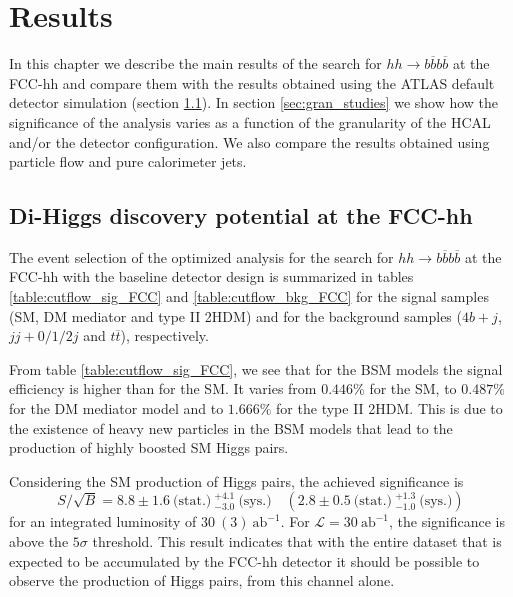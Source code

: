 
\chapter{Results}
\label{chapter:results}

In this chapter we describe the main results of the search for $hh\rightarrow b\overline{b}b\overline{b}$ at the FCC-hh and compare them with the results obtained using the ATLAS default detector simulation (section \ref{sec:dihiggs_FCC}). In section \ref{sec:gran_studies} we show how the significance of the analysis varies as a function of the granularity of the HCAL and/or the detector configuration. We also compare the results obtained using particle flow and pure calorimeter jets.

\section{Di-Higgs discovery potential at the FCC-hh}
\label{sec:dihiggs_FCC}

The event selection of the optimized analysis for the search for $hh\rightarrow b\overline{b}b\overline{b}$ at the FCC-hh with the baseline detector design is summarized in tables \ref{table:cutflow_sig_FCC} and \ref{table:cutflow_bkg_FCC} for the signal samples (SM, DM mediator and type II 2HDM) and for the background samples ($4b+j$, $jj+0/1/2 j$ and $t\overline{t}$), respectively.

From table \ref{table:cutflow_sig_FCC}, we see that for the BSM models the signal efficiency is higher than for the SM. It varies from $0.446\%$ for the SM, to $0.487\%$ for the DM mediator model and to $1.666\%$ for the type II 2HDM. This is due to the existence of heavy new particles in the BSM models that lead to the production of highly boosted SM Higgs pairs.

Considering the SM production of Higgs pairs, the achieved significance is
\begin{equation}
	S/\sqrt{B}=8.8\pm 1.6~\text{(stat.)}~^{+4.1}_{-3.0}~\text{(sys.)}\quad \left(2.8\pm 0.5~\text{(stat.)}~^{+1.3}_{-1.0}~\text{(sys.)}\right)
\end{equation}
for an integrated luminosity of $30~(3)~\text{ab}^{-1}$. For $\mathcal{L}=30~\text{ab}^{-1}$, the significance is above the $5\sigma$ threshold. This result indicates that with the entire dataset that is expected to be accumulated by the FCC-hh detector it should be possible to observe the production of Higgs pairs, from this channel alone.

